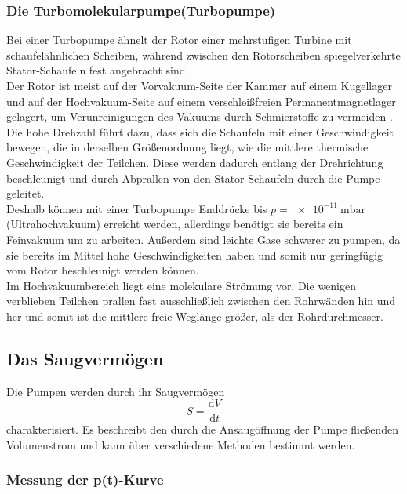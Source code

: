 \subsubsection{Die Turbomolekularpumpe(Turbopumpe)}

Bei einer Turbopumpe ähnelt der Rotor einer mehrstufigen Turbine mit schaufelähnlichen Scheiben, während zwischen den Rotorscheiben spiegelverkehrte Stator-Schaufeln fest angebracht sind.\\
Der Rotor ist meist auf der Vorvakuum-Seite der Kammer auf einem Kugellager und auf der Hochvakuum-Seite auf einem verschleißfreien Permanentmagnetlager gelagert, um Verunreinigungen des Vakuums durch Schmierstoffe zu vermeiden \cite{Pfeiffer}. Die hohe Drehzahl führt dazu, dass sich die Schaufeln mit einer Geschwindigkeit bewegen, die in derselben Größenordnung liegt, wie die mittlere thermische Geschwindigkeit der Teilchen. Diese werden dadurch entlang der Drehrichtung beschleunigt und durch Abprallen von den Stator-Schaufeln durch die Pumpe geleitet.\\
Deshalb können mit einer Turbopumpe Enddrücke bis $p=\SI{e-11}{\milli\bar}$ (Ultrahochvakuum) erreicht werden, allerdings benötigt sie bereits ein Feinvakuum um zu arbeiten. Außerdem sind leichte Gase schwerer zu pumpen, da sie bereits im Mittel hohe Geschwindigkeiten haben und somit nur geringfügig vom Rotor beschleunigt werden können.\\
Im Hochvakuumbereich liegt eine molekulare Strömung vor. Die wenigen verblieben Teilchen prallen fast ausschließlich zwischen den Rohrwänden hin und her und somit ist die mittlere freie Weglänge größer, als der Rohrdurchmesser\cite{Pfeiffer}.


\subsection{Das Saugvermögen}
Die Pumpen werden durch ihr Saugvermögen 
\[
S=\frac{\mathrm{d}V}{\mathrm{d}t}
\]
charakterisiert.
Es beschreibt den durch die Ansaugöffnung der Pumpe fließenden Volumenstrom und kann über verschiedene Methoden bestimmt werden.

\subsubsection{Messung der p(t)-Kurve}

